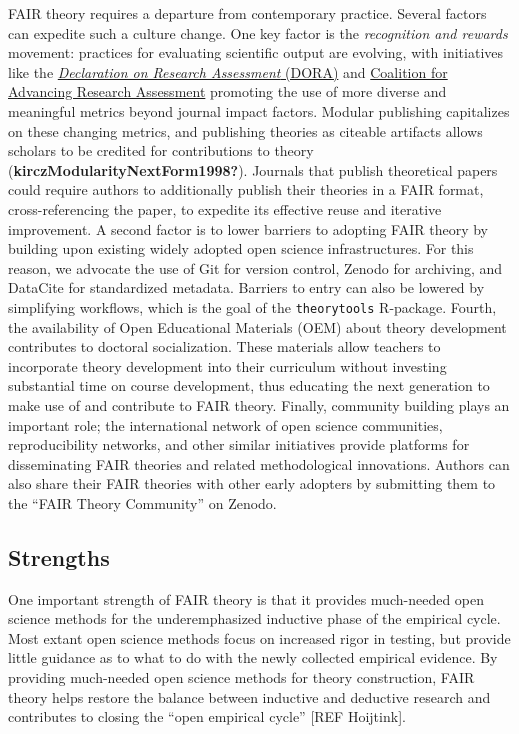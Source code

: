 \documentclass[
  man,floatsintext]{apa6}
\begin{document}
FAIR theory requires a departure from contemporary practice.
Several factors can expedite such a culture change.
One key factor is the \emph{recognition and rewards} movement:
practices for evaluating scientific output are evolving, with initiatives like the \href{https://sfdora.org/read/}{\emph{Declaration on Research Assessment} (DORA)} and \href{https://coara.eu/}{Coalition for Advancing Research Assessment}
promoting the use of more diverse and meaningful metrics beyond journal impact factors.
Modular publishing capitalizes on these changing metrics,
and publishing theories as citeable artifacts allows scholars to be credited for contributions to theory (\textbf{kirczModularityNextForm1998?}).
Journals that publish theoretical papers could require authors to additionally publish their theories in a FAIR format, cross-referencing the paper,
to expedite its effective reuse and iterative improvement.
A second factor is to lower barriers to adopting FAIR theory by building upon existing widely adopted open science infrastructures.
For this reason, we advocate the use of Git for version control, Zenodo for archiving, and DataCite for standardized metadata.
Barriers to entry can also be lowered by simplifying workflows, which is the goal of the \texttt{theorytools} R-package.
Fourth, the availability of Open Educational Materials (OEM) about theory development contributes to doctoral socialization.
These materials allow teachers to incorporate theory development into their curriculum without investing substantial time on course development,
thus educating the next generation to make use of and contribute to FAIR theory.
Finally, community building plays an important role;
the international network of open science communities, reproducibility networks, and other similar initiatives provide platforms for disseminating FAIR theories and related methodological innovations.
Authors can also share their FAIR theories with other early adopters by submitting them to the ``FAIR Theory Community'' on Zenodo.

\subsection{Strengths}\label{strengths}

One important strength of FAIR theory is that it provides much-needed open science methods for the underemphasized inductive phase of the empirical cycle.
Most extant open science methods focus on increased rigor in testing, but provide little guidance as to what to do with the newly collected empirical evidence.
By providing much-needed open science methods for theory construction,
FAIR theory helps restore the balance between inductive and deductive research and contributes to closing the ``open empirical cycle'' {[}REF Hoijtink{]}.
\end{document}
